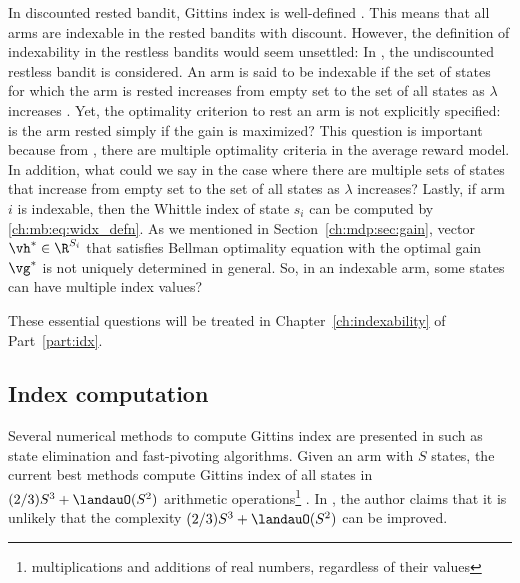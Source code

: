 In discounted rested bandit, Gittins index is well-defined \cite{chakravorty2014multi}.
This means that all arms are indexable in the rested bandits with discount.
However, the definition of indexability in the restless bandits would seem unsettled:
In \cite[Chapter~14]{whittle1996optimal}, the undiscounted restless bandit is considered.
An arm is said to be indexable if the set of states for which the arm is rested increases from empty set to the set of all states as $\lambda$ increases \cite[Page~280]{whittle1996optimal}.
Yet, the optimality criterion to rest an arm is not explicitly specified: is the arm rested simply if the gain is maximized?
This question is important because from \cite{puterman2014markov}, there are multiple optimality criteria in the average reward model.
In addition, what could we say in the case where there are multiple sets of states that increase from empty set to the set of all states as $\lambda$ increases?
Lastly, if arm $i$ is indexable, then the Whittle index of state $s_i$ can be computed by \eqref{ch:mb:eq:widx_defn}.
As we mentioned in Section~\ref{ch:mdp:sec:gain}, vector $\vh^*\in\R^{S_i}$ that satisfies Bellman optimality equation with the optimal gain $\vg^*$ is not uniquely determined in general.
So, in an indexable arm, some states can have multiple index values?

These essential questions will be treated in Chapter~\ref{ch:indexability} of Part~\ref{part:idx}.

\subsection{Index computation}

Several numerical methods to compute Gittins index are presented in \cite{chakravorty2014multi} such as state elimination \cite{sonin2008generalized} and fast-pivoting \cite{nino20072} algorithms.
Given an arm with $S$ states, the current best methods compute Gittins index of all states in $(2/3)S^3+\landauO(S^2)$ arithmetic operations\footnote{multiplications and additions of real numbers, regardless of their values} \cite{chakravorty2014multi}.
In \cite[Page~4]{nino2020fast}, the author claims that it is unlikely that the complexity $(2/3)S^3+\landauO(S^2)$ can be improved.

